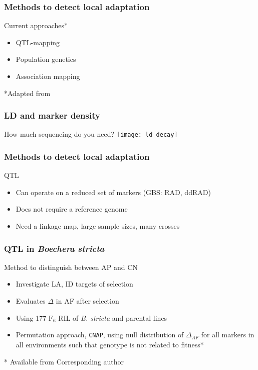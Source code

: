 \begin{frame}
\frametitle{Methods to detect local adaptation}
\begin{block}{Current approaches*}{}
\begin{itemize}
\item{QTL-mapping}
\item{Population genetics}
\item{Association mapping}
\end{itemize}
\end{block}
\tiny
*Adapted from \citet{Savolainen:2013dfa}
\end{frame}

\begin{frame}
\frametitle{LD and marker density}
\begin{block}{How much sequencing do you need?}
\centering
\texttt{[image: ld\_decay]}
\end{block}
\end{frame}


\begin{frame}
\frametitle{Methods to detect local adaptation}
\begin{block}{QTL}
\begin{itemize}
\item{Can operate on a reduced set of markers (GBS: RAD, ddRAD)}
\item{Does not require a reference genome}
\item{Need a linkage map, large sample sizes, many crosses}
\end{itemize}
\end{block}
\end{frame}

\begin{frame}
\frametitle{QTL in \textit{Boechera stricta}}
\begin{block}{Method to distinguish between AP and CN}
\begin{itemize}
\item{Investigate LA, ID targets of selection}
\item{Evaluates $\Delta$ in AF after selection}
\item{Using 177 $\text{F}_6$ RIL of \textit{B. stricta} and parental lines}
\item{Permutation approach, \texttt{CNAP}, using null distribution of
$\Delta_{AF}$ for all markers in all environments such that genotype is 
not related to fitness*}
\end{itemize}
\end{block}
\tiny
* Available from Corresponding author\\
\citet{Anderson:2012cb}
\end{frame}

